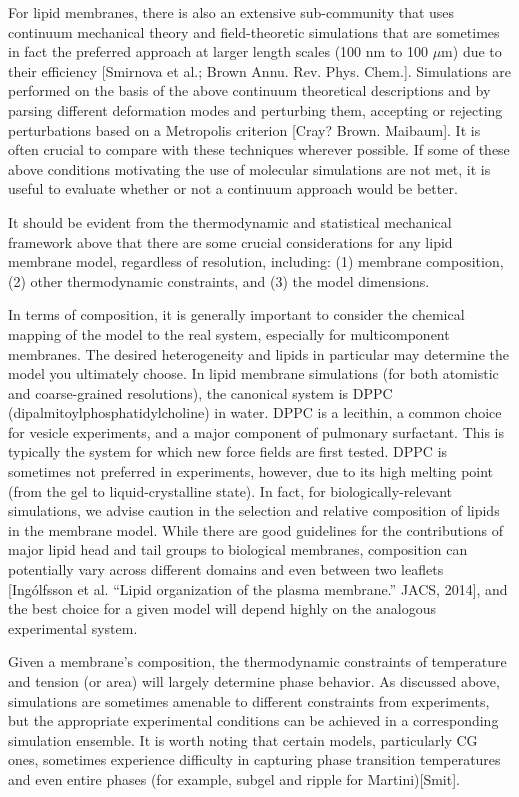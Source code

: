 \documentclass[9pt,bestpractices]{livecoms}
\begin{document}
For lipid membranes, there is also an extensive sub-community that uses continuum mechanical theory and field-theoretic simulations that are sometimes in fact the preferred approach at larger length scales (100 nm to 100 $\mu$m) due to their efficiency [Smirnova et al.; Brown Annu. Rev. Phys. Chem.].
Simulations are performed on the basis of the above continuum theoretical descriptions and by parsing different deformation modes and perturbing them, accepting or rejecting perturbations based on a Metropolis criterion [Cray? Brown. Maibaum].
It is often crucial to compare with these techniques wherever possible.
If some of these above conditions motivating the use of molecular simulations are not met, it is useful to evaluate whether or not a continuum approach would be better.

It should be evident from the thermodynamic and statistical mechanical framework above that there are some crucial considerations for any lipid membrane model, regardless of resolution, including: (1) membrane composition, (2) other thermodynamic constraints, and (3) the model dimensions.

In terms of composition, it is generally important to consider the chemical mapping of the model to the real system, especially for multicomponent membranes.
The desired heterogeneity and lipids in particular may determine the model you ultimately choose.
In lipid membrane simulations (for both atomistic and coarse-grained resolutions), the canonical system is DPPC (dipalmitoylphosphatidylcholine) in water.
DPPC is a lecithin, a common choice for vesicle experiments, and a major component of pulmonary surfactant.
This is typically the system for which new force fields are first tested.
DPPC is sometimes not preferred in experiments, however, due to its high melting point (from the gel to liquid-crystalline state).
In fact, for biologically-relevant simulations, we advise caution in the selection and relative composition of lipids in the membrane model.
While there are good guidelines for the contributions of major lipid head and tail groups to biological membranes, composition can potentially vary across different domains and even between two leaflets [Ing\'olfsson et al. ``Lipid organization of the plasma membrane.'' JACS, 2014], and the best choice for a given model will depend highly on the analogous experimental system.

Given a membrane's composition, the thermodynamic constraints of temperature and tension (or area) will largely determine phase behavior.
As discussed above, simulations are sometimes amenable to different constraints from experiments, but the appropriate experimental conditions can be achieved in a corresponding simulation ensemble.
It is worth noting that certain models, particularly CG ones, sometimes experience difficulty in capturing phase transition temperatures and even entire phases (for example, subgel and ripple for Martini)[Smit].
\end{document}
